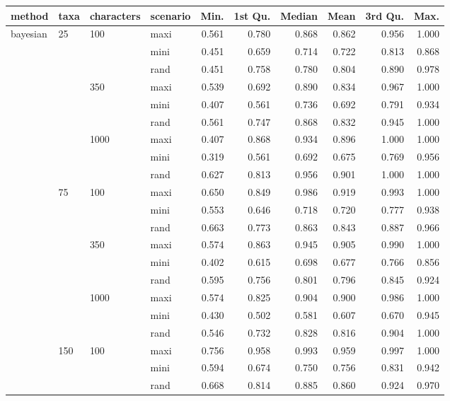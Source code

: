 \begin{longtable}{llllrrrrrr}
  \hline
method & taxa & characters & scenario & Min. & 1st Qu. & Median & Mean & 3rd Qu. & Max. \\ 
  \hline
bayesian & 25 & 100 & maxi & 0.561 & 0.780 & 0.868 & 0.862 & 0.956 & 1.000 \\ 
   &  &  & mini & 0.451 & 0.659 & 0.714 & 0.722 & 0.813 & 0.868 \\ 
   &  &  & rand & 0.451 & 0.758 & 0.780 & 0.804 & 0.890 & 0.978 \\ 
   &  & 350 & maxi & 0.539 & 0.692 & 0.890 & 0.834 & 0.967 & 1.000 \\ 
   &  &  & mini & 0.407 & 0.561 & 0.736 & 0.692 & 0.791 & 0.934 \\ 
   &  &  & rand & 0.561 & 0.747 & 0.868 & 0.832 & 0.945 & 1.000 \\ 
   &  & 1000 & maxi & 0.407 & 0.868 & 0.934 & 0.896 & 1.000 & 1.000 \\ 
   &  &  & mini & 0.319 & 0.561 & 0.692 & 0.675 & 0.769 & 0.956 \\ 
   &  &  & rand & 0.627 & 0.813 & 0.956 & 0.901 & 1.000 & 1.000 \\ 
   & 75 & 100 & maxi & 0.650 & 0.849 & 0.986 & 0.919 & 0.993 & 1.000 \\ 
   &  &  & mini & 0.553 & 0.646 & 0.718 & 0.720 & 0.777 & 0.938 \\ 
   &  &  & rand & 0.663 & 0.773 & 0.863 & 0.843 & 0.887 & 0.966 \\ 
   &  & 350 & maxi & 0.574 & 0.863 & 0.945 & 0.905 & 0.990 & 1.000 \\ 
   &  &  & mini & 0.402 & 0.615 & 0.698 & 0.677 & 0.766 & 0.856 \\ 
   &  &  & rand & 0.595 & 0.756 & 0.801 & 0.796 & 0.845 & 0.924 \\ 
   &  & 1000 & maxi & 0.574 & 0.825 & 0.904 & 0.900 & 0.986 & 1.000 \\ 
   &  &  & mini & 0.430 & 0.502 & 0.581 & 0.607 & 0.670 & 0.945 \\ 
   &  &  & rand & 0.546 & 0.732 & 0.828 & 0.816 & 0.904 & 1.000 \\ 
   & 150 & 100 & maxi & 0.756 & 0.958 & 0.993 & 0.959 & 0.997 & 1.000 \\ 
   &  &  & mini & 0.594 & 0.674 & 0.750 & 0.756 & 0.831 & 0.942 \\ 
   &  &  & rand & 0.668 & 0.814 & 0.885 & 0.860 & 0.924 & 0.970 \\ 

\end{longtable}
